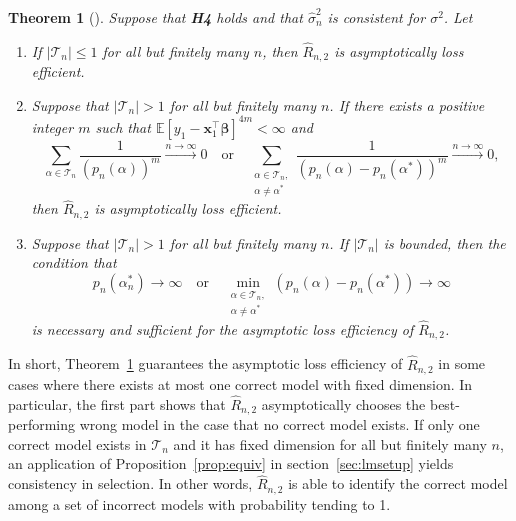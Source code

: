\documentclass[11pt, letter paper]{article}
\newcommand{\1}{\mathmybb{1}}
\newtheorem{theorem}[proposition]{Theorem}
\newcommand{\0}{\emptyset}
\newcommand{\prob}{\mathbb{P}}
\newcommand{\Ep}[1]{\mathbb{E}\left[ #1 \right]}
\newcommand{\paren}[1]{\left(#1 \right)}
\newcommand{\set}[1]{\left\{ #1 \right\}}
\newcommand{\norm}[1]{|\hspace{-1pt}|#1 |\hspace{-1pt}|}
\newcommand{\normsq}[1]{\norm{#1}^{2}}
\newcommand{\Acal}{\mathcal{A}_{n}}
\newcommand{\Tcal}{\mathcal{T}_{n}}
\newcommand{\x}{\boldsymbol{x}}
\newcommand{\e}{\boldsymbol{e}}
\newcommand{\bbeta}{\boldsymbol{\beta}}
\newcommand{\sigmahat}{\hat{\sigma}^{2}_{n}}
\begin{document}
\begin{theorem}[\cite{shao_1997}]\label{thm:97thm1}
    Suppose that \textbf{H4} holds and that \(\sigmahat\) is consistent for \(\sigma^{2}\). Let 
    \begin{enumerate}
        \item If \(|\Tcal|\leq1\) for all but finitely many \(n\), then \(\hat{R}_{n,2}\) is asymptotically loss efficient.
        \item Suppose that \(|\Tcal|> 1\) for all but finitely many \(n\). If there exists a positive integer \(m\) such that \(\Ep{y_{1} - \x_{1}^{\top}\bbeta}^{4m}<\infty\) and 
        \begin{equation}\label{eq:conditionsums}
            \sum_{\alpha\in\Tcal}\frac{1}{\paren{p_{n}(\alpha)}^{m}}\xrightarrow{n\to\infty} 0 \quad\text{or}\quad \sum_{\substack{\alpha\in\Tcal,\\ \alpha\neq\alpha^{*}}}\frac{1}{\paren{p_{n}(\alpha) - p_{n}(\alpha^{*})}^{m}}\xrightarrow{n\to\infty} 0,
        \end{equation}
        then \(\hat{R}_{n,2}\) is asymptotically loss efficient.
        \item Suppose that \(|\Tcal|>1\) for all but finitely many \(n\). 
        If \(|\Tcal|\) is bounded,
        then the condition that
        \begin{equation}
            \label{eq:conditionP}
            p_{n}(\alpha^{*}_{n})\to\infty\quad\text{or}\quad \min_{\substack{\alpha\in\Tcal,\\ \alpha\neq\alpha^{*}}}\paren{p_{n}(\alpha) - p_{n}(\alpha^{*})}\to\infty
        \end{equation}
        is necessary and sufficient for the asymptotic loss efficiency of \(\hat{R}_{n,2}\).
    \end{enumerate}
\end{theorem}

In short, Theorem~\ref{thm:97thm1} guarantees the asymptotic loss efficiency of \(\hat{R}_{n,2}\) in some cases where there exists at most one correct model with fixed dimension. In particular, the first part shows that \(\hat{R}_{n,2}\) asymptotically chooses the best-performing wrong model in the case that no correct model exists. If only one correct model exists in \(\Tcal\) and it has fixed dimension for all but finitely many \(n\), an application of Proposition~\ref{prop:equiv} in section~{\ref{sec:lmsetup}} yields consistency in selection. In other words, \(\hat{R}_{n,2}\) is able to identify the correct model among a set of incorrect models with probability tending to 1.
\end{document}
